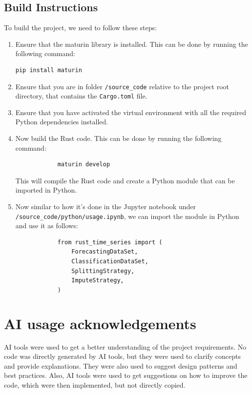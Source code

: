 \documentclass[review]{AIM_report}
\begin{document}
\subsection{Build Instructions}
To build the project, we need to follow these steps:
\begin{enumerate}
    \item Ensure that the maturin library is installed. This can be done by running the following command:
          \begin{verbatim}pip install maturin
    \end{verbatim}
    \item Ensure that you are in folder \texttt{/source\_code} relative to the project root directory, that contains the \texttt{Cargo.toml} file.
    \item Ensure that you have activated the virtual environment with all the required Python dependencies installed.
    \item Now build the Rust code. This can be done by running the following command:
          \begin{verbatim}
            maturin develop
          \end{verbatim}
          This will compile the Rust code and create a Python module that can be imported in Python.
    \item Now similar to how it's done in the Jupyter notebook under \texttt{/source\_code/python/usage.ipynb}, we can import the module in Python and use it as follows:
          \begin{verbatim}
            from rust_time_series import (
                ForecastingDataSet,
                ClassificationDataSet,
                SplittingStrategy,
                ImputeStrategy,
            )
          \end{verbatim}
    
\end{enumerate}


\newpage
\section{AI usage acknowledgements}

AI tools were used to get a better understanding of the project requirements. No code was directly generated by AI tools, but they were used to clarify concepts and provide explanations. They were also used to suggest design patterns and best practices. Also, AI tools were used to get suggestions on how to improve the code, which were then implemented, but not directly copied.
\end{document}
